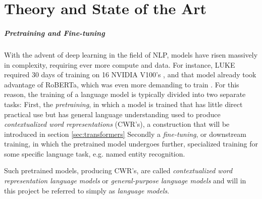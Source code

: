 \documentclass[main.tex]{subfiles}
\begin{document}
\chapter{Theory and State of the Art}
\label{chap:theory}
\paragraph{Pretraining and Fine-tuning}
With the advent of deep learning in the field of NLP, models have risen massively in complexity, requiring ever more compute and data.
For instance, LUKE required 30 days of training on 16 NVIDIA V100's \cite{yamada2020luke}, and that model already took advantage of RoBERTa, which was even more demanding to train \cite{liu2019roberta}.
For this reason, the training of a language model is typically divided into two separate tasks:
First, the \emph{pretraining}, in which a model is trained that has little direct practical use but has general language understanding used to produce \emph{contextualized word representations} (CWR's), a construction that will be introduced in section \ref{sec:transformers}
Secondly a \emph{fine-tuning}, or downstream training, in which the pretrained model undergoes further, specialized training for some specific language task, e.g. named entity recognition.

Such pretrained models, producing CWR's, are called \emph{contextualized word representation language models} or \emph{general-purpose language models} \cite[Ch. 2]{birk2020knowledge} and will in this project be referred to simply as \emph{language models}.
\end{document}
